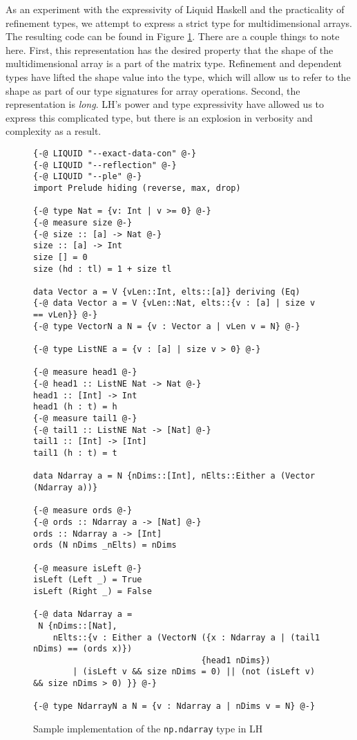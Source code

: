 \documentclass[12pt]{report}
\begin{document}
As an experiment with the expressivity of Liquid Haskell and the practicality of refinement types, we attempt to express a strict type for multidimensional arrays. The resulting code can be found in Figure \ref{lh-nparray}. There are a couple things to note here. First, this representation has the desired property that the shape of the multidimensional array is a part of the matrix type. Refinement and dependent types have lifted the shape value into the type, which will allow us to refer to the shape as part of our type signatures for array operations. Second, the representation is \textit{long}. LH's power and type expressivity have allowed us to express this complicated type, but there is an explosion in verbosity and complexity as a result.

\begin{figure}
    \centering
    {\small\begin{verbatim}
{-@ LIQUID "--exact-data-con" @-}
{-@ LIQUID "--reflection" @-}
{-@ LIQUID "--ple" @-}
import Prelude hiding (reverse, max, drop)

{-@ type Nat = {v: Int | v >= 0} @-}
{-@ measure size @-}
{-@ size :: [a] -> Nat @-}
size :: [a] -> Int
size [] = 0
size (hd : tl) = 1 + size tl

data Vector a = V {vLen::Int, elts::[a]} deriving (Eq)
{-@ data Vector a = V {vLen::Nat, elts::{v : [a] | size v == vLen}} @-}
{-@ type VectorN a N = {v : Vector a | vLen v = N} @-}

{-@ type ListNE a = {v : [a] | size v > 0} @-}

{-@ measure head1 @-}
{-@ head1 :: ListNE Nat -> Nat @-}
head1 :: [Int] -> Int
head1 (h : t) = h
{-@ measure tail1 @-}
{-@ tail1 :: ListNE Nat -> [Nat] @-}
tail1 :: [Int] -> [Int]
tail1 (h : t) = t

data Ndarray a = N {nDims::[Int], nElts::Either a (Vector (Ndarray a))}

{-@ measure ords @-}
{-@ ords :: Ndarray a -> [Nat] @-}
ords :: Ndarray a -> [Int]
ords (N nDims _nElts) = nDims

{-@ measure isLeft @-}
isLeft (Left _) = True
isLeft (Right _) = False

{-@ data Ndarray a =
 N {nDims::[Nat],
    nElts::{v : Either a (VectorN ({x : Ndarray a | (tail1 nDims) == (ords x)})
                                  {head1 nDims})
        | (isLeft v && size nDims = 0) || (not (isLeft v) && size nDims > 0) }} @-}

{-@ type NdarrayN a N = {v : Ndarray a | nDims v = N} @-}\end{verbatim}}
    \caption{Sample implementation of the \texttt{np.ndarray} type in LH}
    \label{lh-nparray}
\end{figure}
\end{document}

